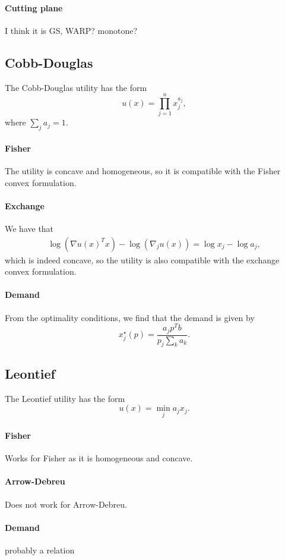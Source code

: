 \documentclass[12pt]{article}
\begin{document}
\paragraph{Cutting plane} I think it is GS, WARP? monotone?

\subsection{Cobb-Douglas}
The Cobb-Douglas utility has the form
\[
u(x) = \prod_{j=1}^{n} x_j^{a_j},
\]
where $\sum_j a_j = 1$.

\paragraph{Fisher}
The utility is concave and homogeneous, so it is compatible with the Fisher
convex formulation.
\paragraph{Exchange}
We have that
\begin{align*}
\log(\nabla u(x)^T x) - \log(\nabla_j u(x)) =
\log x_j - \log a_j,
\end{align*}
which is indeed concave, so the utility is also compatible with
the exchange convex formulation.

\paragraph{Demand}
From the optimality conditions, we find that the demand is given by
\[
x^\star_j(p) = \frac{a_j p^Tb}{p_j\sum_k a_k}.
\]

\subsection{Leontief}
The Leontief utility has the form
\[
u(x) = \min_j a_j x_j.
\]

\paragraph{Fisher}
Works for Fisher as it is homogeneous and concave.

\paragraph{Arrow-Debreu}
Does not work for Arrow-Debreu.

\paragraph{Demand}
probably a relation
\end{document}
